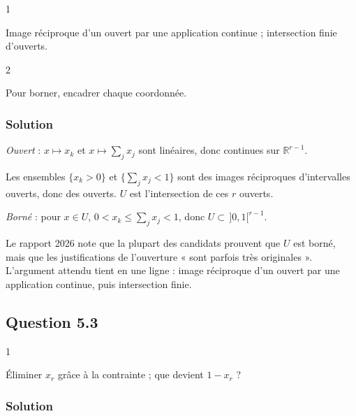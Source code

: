 \documentclass[11pt,a4paper]{article}
\begin{document}
\begin{indication}{1}

Image réciproque d'un ouvert par une application continue ; intersection finie d'ouverts.

\end{indication}

\begin{indication}{2}

Pour borner, encadrer chaque coordonnée.

\end{indication}

\hypertarget{solution-9}{%
\subsubsection{Solution}\label{solution-9}}

\emph{Ouvert} : \(x\mapsto x_k\) et \(x\mapsto\sum_jx_j\) sont linéaires, donc continues sur \(\mathbb R^{r-1}\).

Les ensembles \(\{x_k>0\}\) et \(\{\sum_jx_j<1\}\) sont des images réciproques d'intervalles ouverts, donc des ouverts. \(U\) est l'intersection de ces \(r\) ouverts.

\emph{Borné} : pour \(x\in U\), \(0<x_k\le\sum_jx_j<1\), donc \(U\subset\,]0,1[^{r-1}\).

\begin{jury}

Le rapport 2026 note que la plupart des candidats prouvent que \(U\) est borné, mais que les justifications de l'ouverture « sont parfois très originales ». L'argument attendu tient en une ligne : image réciproque d'un ouvert par une application continue, puis intersection finie.

\end{jury}

\hypertarget{question-5.3}{%
\subsection{Question 5.3}\label{question-5.3}}

\begin{indication}{1}

Éliminer \(x_r\) grâce à la contrainte ; que devient \(1-x_r\) ?

\end{indication}

\hypertarget{solution-10}{%
\subsubsection{Solution}\label{solution-10}}
\end{document}
